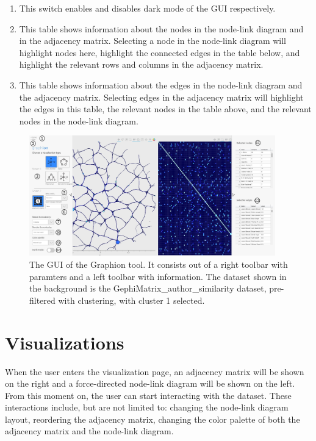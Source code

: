 \documentclass[journal]{vgtc}                %
\begin{document}
\begin{enumerate}
    \item This switch enables and disables dark mode of the GUI respectively.
    \item This table shows information about the nodes in the node-link diagram and in the adjacency matrix. Selecting a node in the node-link diagram will highlight nodes here, highlight the connected edges in the table below, and highlight the relevant rows and columns in the adjacency matrix.
    \item This table shows information about the edges in the node-link diagram and the adjacency matrix. Selecting edges in the adjacency matrix will highlight the edges in this table, the relevant nodes in the table above, and the relevant nodes in the node-link diagram.
\end{enumerate}

\begin{figure}[bt]
    \centering
    \includegraphics[width=0.95\textwidth]{GUI.jpg}
    \caption{The GUI of the Graphion tool. It consists out of a right toolbar with paramters and a left toolbar with information. The dataset shown in the background is the GephiMatrix\_author\_similarity dataset, pre-filtered with clustering, with cluster 1 selected.}
    \label{fig:UI}
\end{figure}

\section{Visualizations} \label{sect:Visualizations} %
When the user enters the visualization page, an adjacency matrix will be shown on the right and a force-directed node-link diagram will be shown on the left. From this moment on, the user can start interacting with the dataset. These interactions include, but are not limited to: changing the node-link diagram layout, reordering the adjacency matrix, changing the color palette of both the adjacency matrix and the node-link diagram.
\end{document}
